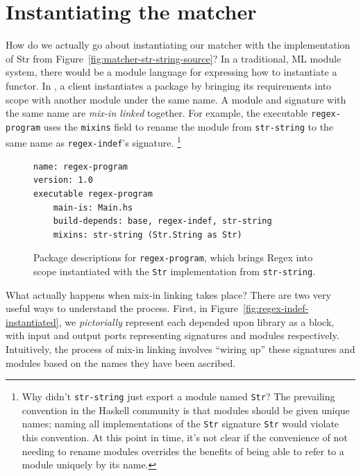 \section{Instantiating the matcher}

How do we actually go about instantiating our matcher with the
implementation of Str from Figure~\ref{fig:matcher-str-string-source}?
In a traditional, ML module system, there would be a module language for
expressing how to instantiate a functor.
In \Backpack{}, a client instantiates a package by bringing its
requirements into scope with another module under the same name.  A
module and signature with the same name are \emph{mix-in linked}
together.  For example, the executable \verb|regex-program| uses the
\verb|mixins| field to rename the module from \verb|str-string| to the
same name as \verb|regex-indef|'s signature.%
%
\footnote{Why didn't \texttt{str-string} just export
a module named \texttt{Str}?  The prevailing convention in the Haskell
community is that modules should be given unique names; naming all
implementations of the \texttt{Str} signature \texttt{Str} would violate
this convention.  At this point in time, it's not clear if the
convenience of not needing to rename modules overrides the benefits of
being able to refer to a module uniquely by its name.}

\begin{figure}
\begin{lstlisting}[language=Cabal]
name: regex-program
version: 1.0
executable regex-program
    main-is: Main.hs
    build-depends: base, regex-indef, str-string
    mixins: str-string (Str.String as Str)
\end{lstlisting}
\caption{Package descriptions for \texttt{regex-program}, which brings
Regex into scope instantiated with the \texttt{Str} implementation from \texttt{str-string}.}
\label{fig:matcher-functorized-packages}
\end{figure}

What actually happens when mix-in linking takes place?  There are two very useful
ways to understand the process.  First, in Figure~\ref{fig:regex-indef-instantiated}, we
\emph{pictorially} represent each depended upon library as a block, with input and output
ports representing signatures and modules respectively.  Intuitively, the process
of mix-in linking involves ``wiring up'' these signatures and modules based on the
names they have been ascribed.

